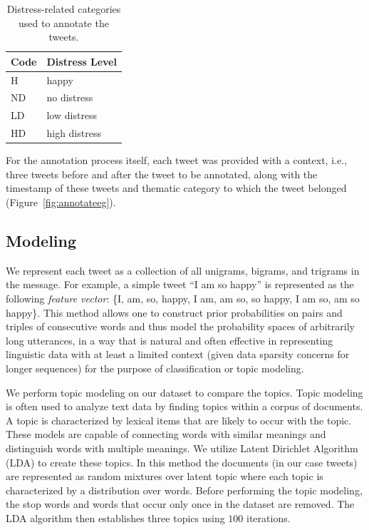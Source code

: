 \documentclass[11pt]{article}
\begin{document}
\begin{table}[h]
  \centering
  \begin{tabular}[h]{ll}
   \textbf{Code}&\textbf{Distress Level}\\
\hline
 H & happy \\
ND & no distress\\
 LD & low distress\\
HD &high distress
  \end{tabular}
  \caption{Distress-related categories used to annotate the tweets.}
  \label{tab:distress}
\end{table}


For the annotation process itself, each tweet was provided with a context, i.e., three tweets before and after the tweet to be annotated, along with the timestamp of these tweets and thematic category to which the tweet belonged (Figure~\ref{fig:annotateeg}).






\subsection{Modeling}
We represent each tweet as a collection of  all unigrams, bigrams, and trigrams in the message. For example, a simple tweet ``I am so happy'' is represented as the following \emph{feature vector}: \{I, am, so, happy, I am, am so, so happy, I am so, am so happy\}. This method allows one to construct prior probabilities on pairs and triples of consecutive words and thus model the probability spaces of arbitrarily long utterances, in a way that is natural and often effective in representing linguistic data with at least a limited context (given data sparsity concerns for longer sequences) for the purpose of classification or topic modeling.



We perform topic modeling on our dataset to compare the topics. Topic modeling is often used to analyze text data by finding topics within a corpus of documents. A topic is characterized by lexical items that are likely to occur with the topic. These models are capable of connecting words with similar meanings and distinguish words with multiple meanings. We utilize  Latent Dirichlet Algorithm (LDA) \cite{Blei} to create these topics. In this method the documents (in our case tweets) are represented as random mixtures over latent topic where each topic is characterized by a distribution over words. Before performing the topic modeling, the stop words and words that occur only once in the dataset are removed. The LDA algorithm then establishes three topics using $100$ iterations. 
\end{document}

